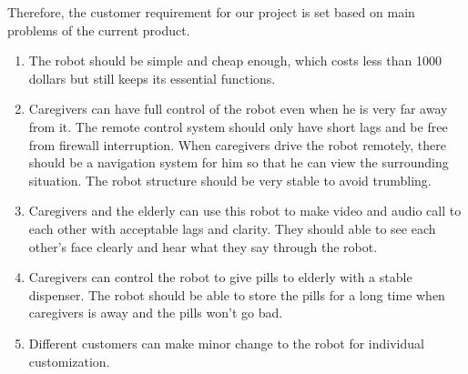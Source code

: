 \documentclass[12pt]{article}
\begin{document}
Therefore, the customer requirement for our project is set based on main problems of the current product.
\begin{enumerate}[-]
\item The robot should be simple and cheap enough, which costs less than 1000 dollars but still keeps its essential functions.
\item Caregivers can have full control of the robot even when he is very far away from it. The remote control system should only have short lags and be free from firewall interruption. When caregivers drive the robot remotely, there should be a navigation system for him so that he can view the surrounding situation. The robot structure should be very stable to avoid trumbling.
\item Caregivers and the elderly can use this robot to make video and audio call to each other with acceptable lags and clarity. They should able to see each other's face clearly and hear what they say through the robot.
\item Caregivers can control the robot to give pills to elderly with a stable dispenser. The robot should be able to store the pills for a long time when caregivers is away and the pills won't go bad.
\item Different customers can make minor change to the robot for individual customization.
\end{enumerate}
\end{document}
